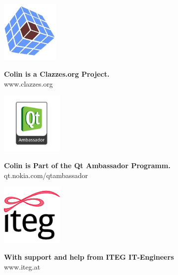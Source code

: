 
\begin{minipage}[h]{0.25\textwidth}
\begin{center}
\includegraphics[height=3cm]{../pictures/clazzes2.jpg}
\end{center}
\end{minipage}
\begin{minipage}[h]{0.75\textwidth}
\textbf{\large{Colin is a Clazzes.org Project.}}
\vspace{8pt}\\
www.clazzes.org
\end{minipage}
\vspace{20pt}
\hline
\vspace{20pt}
\begin{minipage}[h]{0.25\textwidth}
\begin{center}
\includegraphics[height=3cm]{../pictures/qt_ambassador_logo.png}
\end{center}
\end{minipage}
\begin{minipage}[h]{0.75\textwidth}
\textbf{\large{Colin is Part of the Qt Ambassador Programm.}}
\vspace{8pt}\\
qt.nokia.com/qtambassador
\end{minipage}
\vspace{20pt}
\hline
\vspace{20pt}
\begin{minipage}[h]{0.25\textwidth}
\begin{center}
\includegraphics[height=3cm]{../pictures/logo2-icon_128x128.png}
\end{center}
\end{minipage}
\begin{minipage}[h]{0.75\textwidth}
\textbf{\large{With support and help from ITEG IT-Engineers}}
\vspace{8pt}\\
www.iteg.at
\end{minipage}
\ \\

